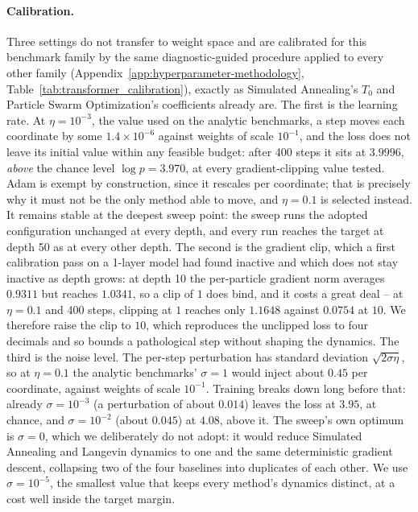 \documentclass{article}
\theoremstyle{plain}
\theoremstyle{definition}
\theoremstyle{remark}
\begin{document}
\paragraph{Calibration.} Three settings do not transfer to weight space and are calibrated for this benchmark family by the
same diagnostic-guided procedure applied to every other family
(Appendix~\ref{app:hyperparameter-methodology}, Table~\ref{tab:transformer_calibration}), exactly
as Simulated Annealing's $T_0$ and Particle Swarm Optimization's coefficients already are. The
first is the learning rate. At $\eta=10^{-3}$, the value used on the analytic benchmarks, a step
moves each coordinate by some $1.4\times10^{-6}$ against weights of scale $10^{-1}$, and the loss
does not leave its initial value within any feasible budget: after 400 steps it sits at $3.9996$,
\emph{above} the chance level $\log p=3.970$, at every gradient-clipping value tested. Adam is
exempt by construction, since it rescales per coordinate; that is precisely why it must not be the
only method able to move, and $\eta=0.1$ is selected instead. It remains stable at the deepest sweep point: the sweep runs the
adopted configuration unchanged at every depth, and every run reaches the target at depth 50 as at
every other depth.
The second is the gradient clip, which a first calibration pass on a 1-layer model had found
inactive and which does not stay inactive as depth grows: at depth 10 the per-particle gradient
norm averages $0.9311$ but reaches $1.0341$, so a clip of $1$ does bind, and it costs a great
deal -- at $\eta=0.1$ and 400 steps, clipping at $1$ reaches only $1.1648$ against $0.0754$ at
$10$. We therefore raise the clip to $10$, which reproduces the unclipped loss to four decimals
and so bounds a pathological step without shaping the dynamics. The third is the noise level. The per-step perturbation has standard deviation
$\sqrt{2\sigma\eta}$, so at $\eta=0.1$ the analytic benchmarks' $\sigma=1$ would inject about $0.45$
per coordinate, against weights of scale $10^{-1}$. Training breaks down long before that: already
$\sigma=10^{-3}$ (a perturbation of about $0.014$) leaves the loss at $3.95$, at chance, and
$\sigma=10^{-2}$ (about $0.045$) at $4.08$, above it. The sweep's own optimum is
$\sigma=0$, which we deliberately do not adopt: it would reduce Simulated Annealing and Langevin
dynamics to one and the same deterministic gradient descent, collapsing two of the four baselines
into duplicates of each other. We use $\sigma=10^{-5}$, the
smallest value that keeps every method's dynamics distinct, at a cost well inside the target
margin.
\end{document}
